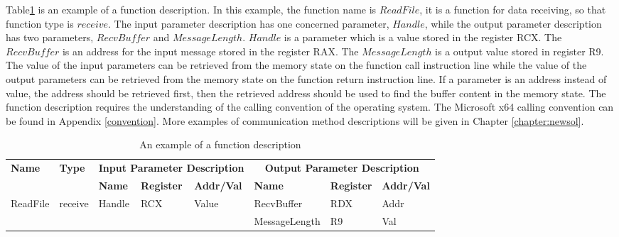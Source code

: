 Table\ref{functionexample} is an example of a function description. In this example, the function name is $ReadFile$, it is a function for data receiving, so that function type is $receive$. The input parameter description has one concerned parameter, $Handle$, while the output parameter description has two parameters, $RecvBuffer$ and $MessageLength$. $Handle$ is a parameter which is a value stored in the register RCX. The $RecvBuffer$ is an address for the input message stored in the register RAX. The $MessageLength$ is a output value stored in register R9. The value of the input parameters can be retrieved from the memory state on the function call instruction line while the value of the output parameters can be retrieved from the memory state on the function return instruction line. If a parameter is an address instead of value, the address should be retrieved first, then the retrieved address should be used to find the buffer content in the memory state. The function description requires the understanding of the calling convention of the operating system. The Microsoft x64 calling convention can be found in Appendix \ref{convention}. More examples of communication method descriptions will be given in Chapter \ref{chapter:newsol}.

\begin{table}[H]
        \centering
        \caption{An example of a function description}
        \label{functionexample}
        \begin{tabular}{|l|l|l|l|l|l|l|l|}
            \hline
             \multirow{2}{*}{{\textbf{Name}}} & \multirow{2}{*}{{\textbf{Type}}} & \multicolumn{3}{c|}{\textbf{Input Parameter Description}} & \multicolumn{3}{c|}{\textbf{Output Parameter Description}} \\
              \cline{3-8} 
             & & \textbf{Name}& \textbf{Register} &  \textbf{Addr/Val} & \textbf{Name}& \textbf{Register} &  \textbf{Addr/Val}  \\
             \hline
             \multirow{2}{*}{ReadFile}
             &\multirow{2}{*}{receive} &  \multirow{2}{*}{Handle} & \multirow{2}{*}{RCX} & \multirow{2}{*}{Value} & RecvBuffer & RDX  & Addr\\
              \cline{6-8} 
             & & & & & MessageLength & R9  & Val\\
            \hline            
        \end{tabular}
    \end{table}

